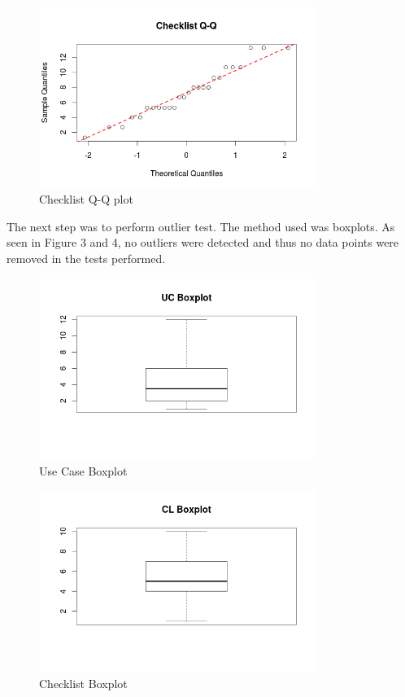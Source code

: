 \documentclass[10pt,twocolumn]{article}
\begin{document}
\begin{figure}[Ht!]
\centering
\includegraphics[width=90mm]{cl_qq.png}
\caption{Checklist Q-Q plot}
\end{figure}


The next step was to perform outlier test. The method used was boxplots. As seen in Figure 3 and 4, no outliers were detected and thus no data points were removed in the tests performed. 

\begin{figure}[Ht!]
\centering
\includegraphics[width=90mm]{uc_box.png}
\caption{Use Case Boxplot}
\end{figure}

\begin{figure}[Ht!]
\centering
\includegraphics[width=90mm]{cl_box.png}
\caption{Checklist Boxplot}
\end{figure}
\end{document}
